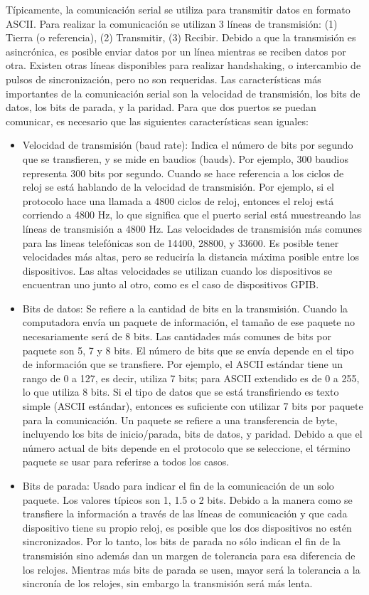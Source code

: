 \documentclass[11pt,letterpaper]{report}
\begin{document}
		Típicamente, la comunicación serial se utiliza para transmitir datos en formato ASCII. Para realizar la comunicación se utilizan 3 líneas de transmisión: (1) Tierra (o referencia), (2) Transmitir, (3) Recibir. Debido a que la transmisión es asincrónica, es posible enviar datos por un línea mientras se reciben datos por otra. Existen otras líneas disponibles para realizar handshaking, o intercambio de pulsos de sincronización, pero no son requeridas. Las características más importantes de la comunicación serial son la velocidad de transmisión, los bits de datos, los bits de parada, y la paridad\citep{instruments2006}. Para que dos puertos se puedan comunicar, es necesario que las siguientes características sean iguales:
		\begin{itemize}
		\item Velocidad de transmisión (baud rate): Indica el número de bits por segundo que se transfieren, y se mide en baudios (bauds). Por ejemplo, 300 baudios representa 300 bits por segundo. Cuando se hace referencia a los ciclos de reloj se está hablando de la velocidad de transmisión. Por ejemplo, si el protocolo hace una llamada a 4800 ciclos de reloj, entonces el reloj está corriendo a 4800 Hz, lo que significa que el puerto serial está muestreando las líneas de transmisión a 4800 Hz. Las velocidades de transmisión más comunes para las lineas telefónicas son de 14400, 28800, y 33600. Es posible tener velocidades más altas, pero se reduciría la distancia máxima posible entre los dispositivos. Las altas velocidades se utilizan cuando los dispositivos se encuentran uno junto al otro, como es el caso de dispositivos GPIB.
		\item Bits de datos: Se refiere a la cantidad de bits en la transmisión. Cuando la computadora envía un paquete de información, el tamaño de ese paquete no necesariamente será de 8 bits. Las cantidades más comunes de bits por paquete son 5, 7 y 8 bits. El número de bits que se envía depende en el tipo de información que se transfiere. Por ejemplo, el ASCII estándar tiene un rango de 0 a 127, es decir, utiliza 7 bits; para ASCII extendido es de 0 a 255, lo que utiliza 8 bits. Si el tipo de datos que se está transfiriendo es texto simple (ASCII estándar), entonces es suficiente con utilizar 7 bits por paquete para la comunicación. Un paquete se refiere a una transferencia de byte, incluyendo los bits de inicio/parada, bits de datos, y paridad. Debido a que el número actual de bits depende en el protocolo que se seleccione, el término paquete se usar para referirse a todos los casos.
		\item Bits de parada: Usado para indicar el fin de la comunicación de un solo paquete. Los valores típicos son 1, 1.5 o 2 bits. Debido a la manera como se transfiere la información a través de las líneas de comunicación y que cada dispositivo tiene su propio reloj, es posible que los dos dispositivos no estén sincronizados. Por lo tanto, los bits de parada no sólo indican el fin de la transmisión sino además dan un margen de tolerancia para esa diferencia de los relojes. Mientras más bits de parada se usen, mayor será la tolerancia a la sincronía de los relojes, sin embargo la transmisión será más lenta.

\end{itemize}
\end{document}
